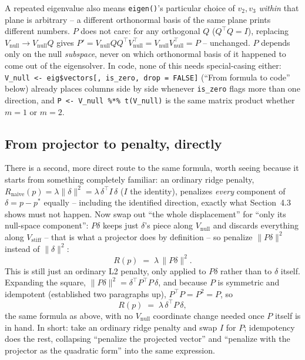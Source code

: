 \documentclass[11pt]{article}
\newcommand{\code}[1]{\texttt{#1}}
\begin{document}
A repeated eigenvalue also means \code{eigen()}'s particular choice of
$v_2,v_3$ \emph{within} that plane is arbitrary -- a different orthonormal
basis of the same plane prints different numbers. $P$ does not care: for any
orthogonal $Q$ ($Q^\top Q=I$), replacing $V_{\mathrm{null}}\to
V_{\mathrm{null}}Q$ gives $P'=V_{\mathrm{null}}QQ^\top
V_{\mathrm{null}}^\top=V_{\mathrm{null}}V_{\mathrm{null}}^\top=P$ --
unchanged. $P$ depends only on the null \emph{subspace}, never on which
orthonormal basis of it happened to come out of the eigensolver. In code,
none of this needs special-casing either: \code{V\_null <-
eig\$vectors[, is\_zero, drop = FALSE]} (``From formula to code'' below)
already places columns side by side whenever \code{is\_zero} flags more than
one direction, and \code{P <- V\_null \%*\% t(V\_null)} is the same matrix
product whether $m=1$ or $m=2$.

\subsection*{From projector to penalty, directly}

There is a second, more direct route to the same formula, worth seeing
because it starts from something completely familiar: an ordinary ridge
penalty, $R_{\mathrm{naive}}(p)=\lambda\lVert\delta\rVert^2=\lambda\,\delta^\top
I\,\delta$ ($I$ the identity), penalizes \emph{every} component of
$\delta=p-p^*$ equally -- including the identified direction, exactly what
Section~4.3 shows must not happen. Now swap out ``the whole displacement''
for ``only its null-space component'': $P\delta$ keeps just $\delta$'s piece
along $V_{\mathrm{null}}$ and discards everything along $V_{\mathrm{stiff}}$
-- that is what a projector does by definition -- so penalize $\lVert
P\delta\rVert^2$ instead of $\lVert\delta\rVert^2$:
\begin{equation}
  R(p) \;=\; \lambda\,\lVert P\delta\rVert^2.
\end{equation}
This is still just an ordinary L2 penalty, only applied to $P\delta$ rather
than to $\delta$ itself. Expanding the square, $\lVert P\delta\rVert^2 =
\delta^\top P^\top P\,\delta$, and because $P$ is symmetric and idempotent
(established two paragraphs up), $P^\top P = P^2 = P$, so
\begin{equation}
  R(p) \;=\; \lambda\,\delta^\top P\,\delta,
\end{equation}
the same formula as above, with no $V_{\mathrm{null}}$ coordinate change
needed once $P$ itself is in hand. In short: take an ordinary ridge penalty
and swap $I$ for $P$; idempotency does the rest, collapsing ``penalize the
projected vector'' and ``penalize with the projector as the quadratic form''
into the same expression.
\end{document}
